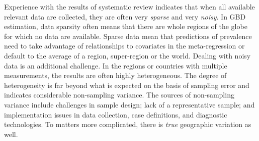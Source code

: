 Experience with the results of systematic review indicates that when
all available relevant data are collected, they are often very
\emph{sparse} and very \emph{noisy}.  In GBD estimation, data sparsity
often means that there are whole regions of the globe for which no
data are available.  Sparse data mean that predictions of prevalence
need to take advantage of relationships to covariates in the
meta-regression or default to the average of a region, super-region or
the world.  Dealing with noisy data is an additional challenge. In the
regions or countries with multiple measurements, the results are often
highly heterogeneous. The degree of heterogeneity is far beyond what
is expected on the basis of sampling error and indicates considerable
non-sampling variance.  The sources of non-sampling variance include
challenges in sample design; lack of a representative sample; and
implementation issues in data collection, case definitions, and
diagnostic technologies.  To matters more complicated, there
is \emph{true} geographic variation as well.

